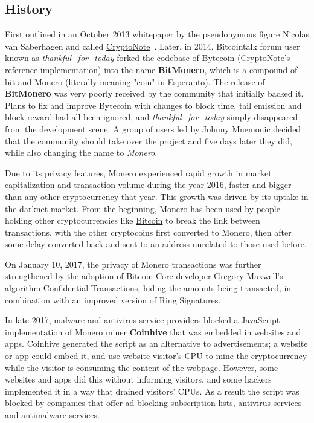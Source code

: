 \subsection{History}
First outlined in an October 2013 whitepaper by the pseudonymous figure Nicolas van Saberhagen and called \hyperref[sec:CryptoNote]{CryptoNote}~\cite{citeulike:14139412}. Later, in 2014, Bitcointalk forum user known as \emph{thankful\_for\_today} forked the codebase of Bytecoin (CryptoNote's reference implementation) into the name \textbf{BitMonero}, which is a compound of bit and Monero (literally meaning "coin" in Esperanto). The release of \textbf{BitMonero} was very poorly received by the community that initially backed it. Plans to fix and improve Bytecoin with changes to block time, tail emission and block reward had all been ignored, and \emph{thankful\_for\_today} simply disappeared from the development scene. A group of users led by Johnny Mnemonic decided that the community should take over the project and five days later they did, while also changing the name to \emph{Monero}.

Due to its privacy features, Monero experienced rapid growth in market capitalization and transaction volume during the year 2016, faster and bigger than any other cryptocurrency that year. This growth was driven by its uptake in the darknet market. From the beginning, Monero has been used by people holding other cryptocurrencies like \hyperref[sec:Bitcoin]{Bitcoin} to break the link between transactions, with the other cryptocoins first converted to Monero, then after some delay converted back and sent to an address unrelated to those used before.

On January 10, 2017, the privacy of Monero transactions was further strengthened by the adoption of Bitcoin Core developer Gregory Maxwell's algorithm Confidential Transactions, hiding the amounts being transacted, in combination with an improved version of Ring Signatures.

In late 2017, malware and antivirus service providers blocked a JavaScript implementation of Monero miner \textbf{Coinhive} that was embedded in websites and apps. Coinhive generated the script as an alternative to advertisements; a website or app could embed it, and use website visitor's CPU to mine the cryptocurrency while the visitor is consuming the content of the webpage. However, some websites and apps did this without informing visitors, and some hackers implemented it in a way that drained visitors' CPUs. As a result the script was blocked by companies that offer ad blocking subscription lists, antivirus services and antimalware services.

